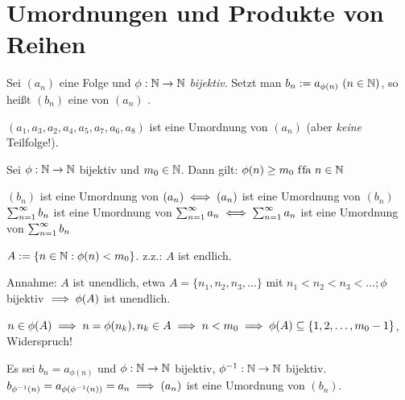 \documentclass[a4paper,oneside,DIV15,BCOR12mm]{scrbook}
\begin{document}
\chapter{Umordnungen und Produkte von Reihen}

\begin{definition}[Umordnung]
Sei $(a_n)$ eine Folge und $\phi: \mathbb{N} \to \mathbb{N}$ \emph{bijektiv}. Setzt man $b_n:=a_{\phi(n)}\ (n\in\mathbb{N})$, so heißt $(b_n)$  eine  von $(a_n)$ \alt{$\areihe$}.
\end{definition}

\begin{beispiel}
$(a_1,a_3,a_2,a_4,a_5,a_7,a_6,a_8)$ ist eine Umordnung von $(a_n)$ (aber \emph{keine} Teilfolge!).
\end{beispiel}

\begin{hilfssatz}
\begin{liste}
\item Sei $\phi: \mathbb{N} \to \mathbb{N}$ bijektiv und $m_0\in\mathbb{N}$. Dann gilt: $\phi(n) \ge m_0 \text{ f\/fa } n\in\mathbb{N}$
\item $(b_n)$ ist eine Umordnung von $(a_n) \iff (a_n)$ ist eine Umordnung von $(b_n)$ \\
$\sum_{n=1}^{\infty}{b_n}$ ist eine Umordnung von $\sum_{n=1}^{\infty}{a_n} \iff \sum_{n=1}^{\infty}{a_n}$ ist eine Umordnung von $\sum_{n=1}^{\infty}{b_n}$
\end{liste}
\end{hilfssatz}

\begin{beweise}
\item $A:=\{n\in\mathbb{N}: \phi(n)<m_0\}$. z.z.: $A$ ist endlich.

Annahme: $A$ ist unendlich, etwa $A=\{n_1,n_2,n_3,\ldots\}$ mit $n_1<n_2<n_3<\ldots; \phi$ bijektiv $\implies \phi(A)$ ist unendlich.

$n\in\phi(A) \implies n=\phi(n_k), n_k\in A \implies n<m_0 \implies \phi(A) \subseteq \{1,2,\ldots,m_0-1\}$, Widerspruch!

\item Es sei $b_n=a_{\phi(n)}$ und $\phi: \mathbb{N} \to \mathbb{N}$ bijektiv, $\phi^{-1}: \mathbb{N} \to \mathbb{N}$ bijektiv. $b_{\phi^{-1}(n)} = a_{\phi(\phi^{-1}(n))} = a_n \implies (a_n)$ ist eine Umordnung von $(b_n)$.
\end{beweise}
\end{document}
